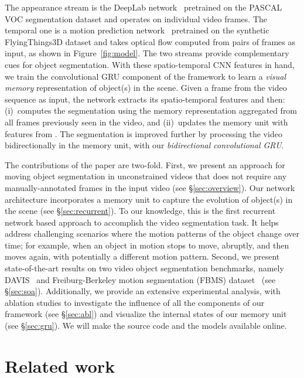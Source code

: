 \documentclass[10pt,twocolumn,letterpaper]{article}
\begin{document}
The appearance stream is the DeepLab network~\cite{chen2014semantic} pretrained
on the PASCAL VOC segmentation dataset and operates on individual video frames.
The temporal one is a motion prediction network~\cite{tokmakov2016learning}
pretrained on the synthetic FlyingThings3D dataset and takes optical flow
computed from pairs of frames as input, as shown in Figure~\ref{fig:model}. The
two streams provide complementary cues for object segmentation. With these
spatio-temporal CNN features in hand, we train the convolutional GRU component
of the framework to learn a {\it visual memory} representation of object(s) in
the scene. Given a frame  from the video sequence as input, the network
extracts its spatio-temporal features and then: (i)~computes the segmentation
using the memory representation aggregated from all frames previously seen in
the video, and (ii)~updates the memory unit with features from . The
segmentation is improved further by processing the video bidirectionally in the
memory unit, with our {\it bidirectional convolutional GRU}.

The contributions of the paper are two-fold. First, we present an approach for
moving object segmentation in unconstrained videos that does not require any
manually-annotated frames in the input video (see \S\ref{sec:overview}).  Our
network architecture incorporates a memory unit to capture the evolution of
object(s) in the scene (see \S\ref{sec:recurrent}). To our knowledge, this is
the first recurrent network based approach to accomplish the video segmentation
task. It helps address challenging scenarios where the motion patterns of the
object change over time; for example, when an object in motion stops to move,
abruptly, and then moves again, with potentially a different motion pattern.
Second, we present state-of-the-art results on two video object segmentation
benchmarks, namely DAVIS~\cite{Perazzi16} and Freiburg-Berkeley motion
segmentation (FBMS) dataset~\cite{ochs2014segmentation} (see \S\ref{sec:soa}).
Additionally, we provide an extensive experimental analysis, with ablation
studies to investigate the influence of all the components of our framework
(see \S\ref{sec:abl}) and visualize the internal states of our memory unit (see
\S\ref{sec:gru}). We will make the source code and the models available online.  

\section{Related work}
\label{sec:rel}
\end{document}
